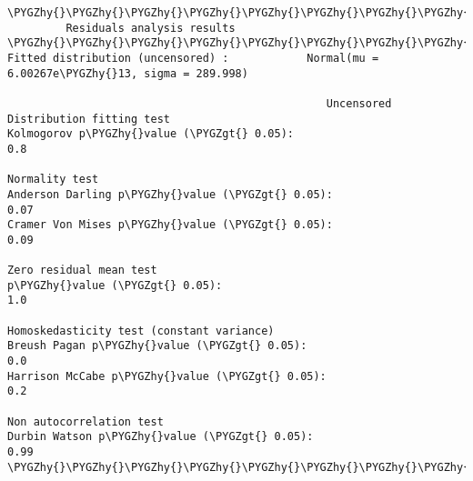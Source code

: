 \documentclass[letterpaper,10pt,english]{sphinxmanual}
\def\PYGZgt{\char`\>}
\def\PYGZhy{\char`\-}
\begin{document}
\begin{Verbatim}[commandchars=\\\{\}]
\PYGZhy{}\PYGZhy{}\PYGZhy{}\PYGZhy{}\PYGZhy{}\PYGZhy{}\PYGZhy{}\PYGZhy{}\PYGZhy{}\PYGZhy{}\PYGZhy{}\PYGZhy{}\PYGZhy{}\PYGZhy{}\PYGZhy{}\PYGZhy{}\PYGZhy{}\PYGZhy{}\PYGZhy{}\PYGZhy{}\PYGZhy{}\PYGZhy{}\PYGZhy{}\PYGZhy{}\PYGZhy{}\PYGZhy{}\PYGZhy{}\PYGZhy{}\PYGZhy{}\PYGZhy{}\PYGZhy{}\PYGZhy{}\PYGZhy{}\PYGZhy{}\PYGZhy{}\PYGZhy{}\PYGZhy{}\PYGZhy{}\PYGZhy{}\PYGZhy{}\PYGZhy{}\PYGZhy{}\PYGZhy{}\PYGZhy{}\PYGZhy{}\PYGZhy{}\PYGZhy{}\PYGZhy{}\PYGZhy{}\PYGZhy{}\PYGZhy{}\PYGZhy{}\PYGZhy{}\PYGZhy{}\PYGZhy{}\PYGZhy{}\PYGZhy{}\PYGZhy{}\PYGZhy{}\PYGZhy{}\PYGZhy{}\PYGZhy{}\PYGZhy{}\PYGZhy{}\PYGZhy{}\PYGZhy{}\PYGZhy{}\PYGZhy{}\PYGZhy{}\PYGZhy{}\PYGZhy{}\PYGZhy{}\PYGZhy{}\PYGZhy{}\PYGZhy{}\PYGZhy{}\PYGZhy{}\PYGZhy{}\PYGZhy{}\PYGZhy{}
         Residuals analysis results
\PYGZhy{}\PYGZhy{}\PYGZhy{}\PYGZhy{}\PYGZhy{}\PYGZhy{}\PYGZhy{}\PYGZhy{}\PYGZhy{}\PYGZhy{}\PYGZhy{}\PYGZhy{}\PYGZhy{}\PYGZhy{}\PYGZhy{}\PYGZhy{}\PYGZhy{}\PYGZhy{}\PYGZhy{}\PYGZhy{}\PYGZhy{}\PYGZhy{}\PYGZhy{}\PYGZhy{}\PYGZhy{}\PYGZhy{}\PYGZhy{}\PYGZhy{}\PYGZhy{}\PYGZhy{}\PYGZhy{}\PYGZhy{}\PYGZhy{}\PYGZhy{}\PYGZhy{}\PYGZhy{}\PYGZhy{}\PYGZhy{}\PYGZhy{}\PYGZhy{}\PYGZhy{}\PYGZhy{}\PYGZhy{}\PYGZhy{}\PYGZhy{}\PYGZhy{}\PYGZhy{}\PYGZhy{}\PYGZhy{}\PYGZhy{}\PYGZhy{}\PYGZhy{}\PYGZhy{}\PYGZhy{}\PYGZhy{}\PYGZhy{}\PYGZhy{}\PYGZhy{}\PYGZhy{}\PYGZhy{}\PYGZhy{}\PYGZhy{}\PYGZhy{}\PYGZhy{}\PYGZhy{}\PYGZhy{}\PYGZhy{}\PYGZhy{}\PYGZhy{}\PYGZhy{}\PYGZhy{}\PYGZhy{}\PYGZhy{}\PYGZhy{}\PYGZhy{}\PYGZhy{}\PYGZhy{}\PYGZhy{}\PYGZhy{}\PYGZhy{}
Fitted distribution (uncensored) :            Normal(mu = 6.00267e\PYGZhy{}13, sigma = 289.998)

                                                 Uncensored
Distribution fitting test
Kolmogorov p\PYGZhy{}value (\PYGZgt{} 0.05):                            0.8

Normality test
Anderson Darling p\PYGZhy{}value (\PYGZgt{} 0.05):                     0.07
Cramer Von Mises p\PYGZhy{}value (\PYGZgt{} 0.05):                     0.09

Zero residual mean test
p\PYGZhy{}value (\PYGZgt{} 0.05):                                       1.0

Homoskedasticity test (constant variance)
Breush Pagan p\PYGZhy{}value (\PYGZgt{} 0.05):                          0.0
Harrison McCabe p\PYGZhy{}value (\PYGZgt{} 0.05):                       0.2

Non autocorrelation test
Durbin Watson p\PYGZhy{}value (\PYGZgt{} 0.05):                        0.99
\PYGZhy{}\PYGZhy{}\PYGZhy{}\PYGZhy{}\PYGZhy{}\PYGZhy{}\PYGZhy{}\PYGZhy{}\PYGZhy{}\PYGZhy{}\PYGZhy{}\PYGZhy{}\PYGZhy{}\PYGZhy{}\PYGZhy{}\PYGZhy{}\PYGZhy{}\PYGZhy{}\PYGZhy{}\PYGZhy{}\PYGZhy{}\PYGZhy{}\PYGZhy{}\PYGZhy{}\PYGZhy{}\PYGZhy{}\PYGZhy{}\PYGZhy{}\PYGZhy{}\PYGZhy{}\PYGZhy{}\PYGZhy{}\PYGZhy{}\PYGZhy{}\PYGZhy{}\PYGZhy{}\PYGZhy{}\PYGZhy{}\PYGZhy{}\PYGZhy{}\PYGZhy{}\PYGZhy{}\PYGZhy{}\PYGZhy{}\PYGZhy{}\PYGZhy{}\PYGZhy{}\PYGZhy{}\PYGZhy{}\PYGZhy{}\PYGZhy{}\PYGZhy{}\PYGZhy{}\PYGZhy{}\PYGZhy{}\PYGZhy{}\PYGZhy{}\PYGZhy{}\PYGZhy{}\PYGZhy{}\PYGZhy{}\PYGZhy{}\PYGZhy{}\PYGZhy{}\PYGZhy{}\PYGZhy{}\PYGZhy{}\PYGZhy{}\PYGZhy{}\PYGZhy{}\PYGZhy{}\PYGZhy{}\PYGZhy{}\PYGZhy{}\PYGZhy{}\PYGZhy{}\PYGZhy{}\PYGZhy{}\PYGZhy{}\PYGZhy{}
\end{Verbatim}
\end{document}

